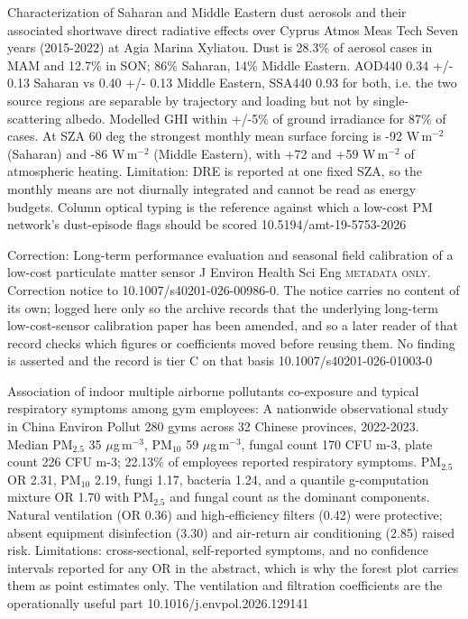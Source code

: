 \documentclass[10pt]{article}
\begin{document}

{Characterization of Saharan and Middle Eastern dust aerosols and their associated shortwave direct radiative effects over Cyprus}
{Atmos Meas Tech}
{Seven years (2015-2022) at Agia Marina Xyliatou. Dust is 28.3\% of aerosol cases in MAM and 12.7\% in SON; 86\% Saharan, 14\% Middle Eastern. AOD440 0.34 +/- 0.13 Saharan vs 0.40 +/- 0.13 Middle Eastern, SSA440 0.93 for both, i.e. the two source regions are separable by trajectory and loading but not by single-scattering albedo. Modelled GHI within +/-5\% of ground irradiance for 87\% of cases. At SZA 60 deg the strongest monthly mean surface forcing is -92 W\,m$^{-2}$ (Saharan) and -86 W\,m$^{-2}$ (Middle Eastern), with +72 and +59 W\,m$^{-2}$ of atmospheric heating. Limitation: DRE is reported at one fixed SZA, so the monthly means are not diurnally integrated and cannot be read as energy budgets. Column optical typing is the reference against which a low-cost PM network's dust-episode flags should be scored}
{10.5194/amt-19-5753-2026}

{Correction: Long-term performance evaluation and seasonal field calibration of a low-cost particulate matter sensor}
{J Environ Health Sci Eng}
{\textsc{metadata only.} Correction notice to 10.1007/s40201-026-00986-0. The notice carries no content of its own; logged here only so the archive records that the underlying long-term low-cost-sensor calibration paper has been amended, and so a later reader of that record checks which figures or coefficients moved before reusing them. No finding is asserted and the record is tier C on that basis}
{10.1007/s40201-026-01003-0}


{Association of indoor multiple airborne pollutants co-exposure and typical respiratory symptoms among gym employees: A nationwide observational study in China}
{Environ Pollut}
{280 gyms across 32 Chinese provinces, 2022-2023. Median PM$_{2.5}$ 35 $\mu$g\,m$^{-3}$, PM$_{10}$ 59 $\mu$g\,m$^{-3}$, fungal count 170 CFU m-3, plate count 226 CFU m-3; 22.13\% of employees reported respiratory symptoms. PM$_{2.5}$ OR 2.31, PM$_{10}$ 2.19, fungi 1.17, bacteria 1.24, and a quantile g-computation mixture OR 1.70 with PM$_{2.5}$ and fungal count as the dominant components. Natural ventilation (OR 0.36) and high-efficiency filters (0.42) were protective; absent equipment disinfection (3.30) and air-return air conditioning (2.85) raised risk. Limitations: cross-sectional, self-reported symptoms, and no confidence intervals reported for any OR in the abstract, which is why the forest plot carries them as point estimates only. The ventilation and filtration coefficients are the operationally useful part}
{10.1016/j.envpol.2026.129141}
\end{document}
